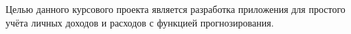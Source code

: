 


Целью данного курсового проекта является разработка приложения для простого учёта 
личных доходов и расходов с функцией прогнозирования.